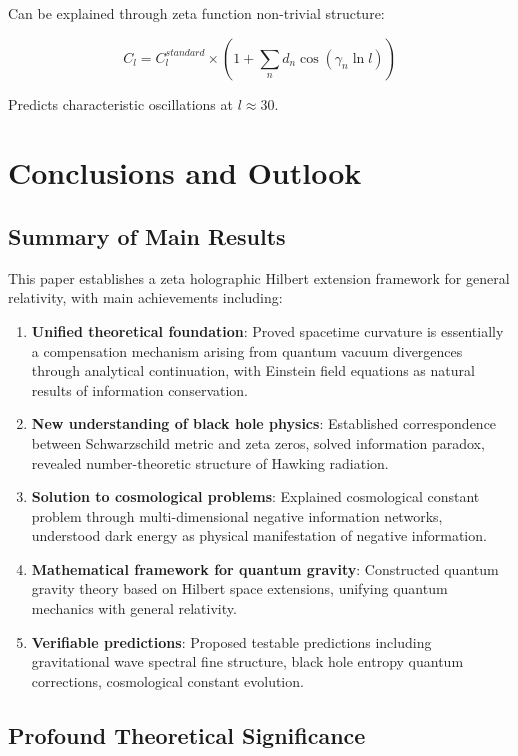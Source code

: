\documentclass[12pt,a4paper]{article}
\begin{document}
Can be explained through zeta function non-trivial structure:

$$C_l = C_l^{standard} \times \left(1 + \sum_{n} d_n \cos(\gamma_n \ln l)\right)$$

Predicts characteristic oscillations at $l \approx 30$.

\section{Conclusions and Outlook}

\subsection{Summary of Main Results}

This paper establishes a zeta holographic Hilbert extension framework for general relativity, with main achievements including:

\begin{enumerate}
\item \textbf{Unified theoretical foundation}: Proved spacetime curvature is essentially a compensation mechanism arising from quantum vacuum divergences through analytical continuation, with Einstein field equations as natural results of information conservation.

\item \textbf{New understanding of black hole physics}: Established correspondence between Schwarzschild metric and zeta zeros, solved information paradox, revealed number-theoretic structure of Hawking radiation.

\item \textbf{Solution to cosmological problems}: Explained cosmological constant problem through multi-dimensional negative information networks, understood dark energy as physical manifestation of negative information.

\item \textbf{Mathematical framework for quantum gravity}: Constructed quantum gravity theory based on Hilbert space extensions, unifying quantum mechanics with general relativity.

\item \textbf{Verifiable predictions}: Proposed testable predictions including gravitational wave spectral fine structure, black hole entropy quantum corrections, cosmological constant evolution.
\end{enumerate}

\subsection{Profound Theoretical Significance}
\end{document}
